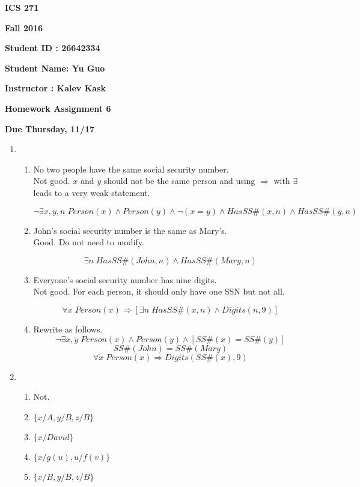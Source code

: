 \documentclass{article}
\begin{document}
{\bf ICS 271}

{\bf Fall 2016}

{\bf Student ID : 26642334}

{\bf Student Name: Yu Guo}

{\bf Instructor : Kalev Kask}

{\bf Homework Assignment 6}

{\bf Due Thursday, 11/17}




\begin{enumerate}

\item
	\begin{enumerate}
		\item No two people have the same social security number. \\
		Not good. $x$ and $y$ should not be the same person and using $\Rightarrow$ with $\exists$ leads to a very weak statement.

		$$\neg\exists x,y,n \; Person(x)\land Person(y)\land \neg(x=y) \land HasSS\#(x,n)\land HasSS\#(y,n)$$


		\item John's social security number is the same as Mary's.\\
		Good. Do not need to modify.

		$$\exists n \; HasSS\#(John,n) \land HasSS\#(Mary,n)$$

		\item Everyone's social security number has nine digits. \\
		Not good. For each person, it should only have one SSN but not all.

		$$\forall x \; Person(x) \Rightarrow [\exists n \; HasSS\#(x,n) \land Digits(n,9)]$$


		\item Rewrite as follows.
		$$\neg\exists x,y \; Person(x)\land Person(y) \land [SS\#(x)=SS\#(y)]$$
		$$SS\#(John)=SS\#(Mary)$$
		$$\forall x \; Person(x) \Rightarrow Digits(SS\#(x),9)$$


	\end{enumerate}

\item
	\begin{enumerate}
		\item Not.
		\item $\{x/A,y/B,z/B\}$
		\item $\{x/David\}$
		\item $\{x/g(u),u/f(v)\}$
		\item $\{x/B,y/B,z/B\}$
	\end{enumerate}


\end{enumerate}
\end{document}
